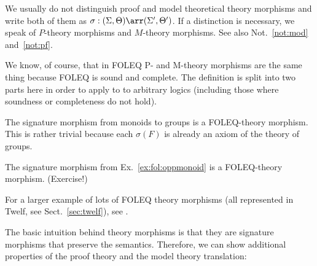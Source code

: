 \begin{notation}
We usually do not distinguish proof and model theoretical theory morphisms and write both of them as $\sigma:(\Sigma,\Theta)\arr(\Sigma',\Theta')$.
If a distinction is necessary, we speak of $P$-theory morphisms and $M$-theory morphisms. See also Not.~\ref{not:mod} and~\ref{not:pf}.
\end{notation}

\begin{remark}
We know, of course, that in FOLEQ P- and M-theory morphisms are the same thing because FOLEQ is sound and complete. The definition is split into two parts here in order to apply to to arbitrary logics (including those where soundness or completeness do not hold).
\end{remark}

\begin{example}
The signature morphism from monoids to groups is a FOLEQ-theory morphism. This is rather trivial because each $\sigma(F)$ is already an axiom of the theory of groups.
\end{example}

\begin{example}
The signature morphism from Ex.~\ref{ex:fol:oppmonoid} is a FOLEQ-theory morphism. (Exercise!)
\end{example}

\begin{example}
For a larger example of lots of FOLEQ theory morphisms (all represented in Twelf, see Sect.~\ref{sec:twelf}), see \cite{DHS:algebra:09}.
\end{example}


The basic intuition behind theory morphisms is that they are signature morphisms that preserve the semantics. Therefore, we can show additional properties of the proof theory and the model theory translation:

